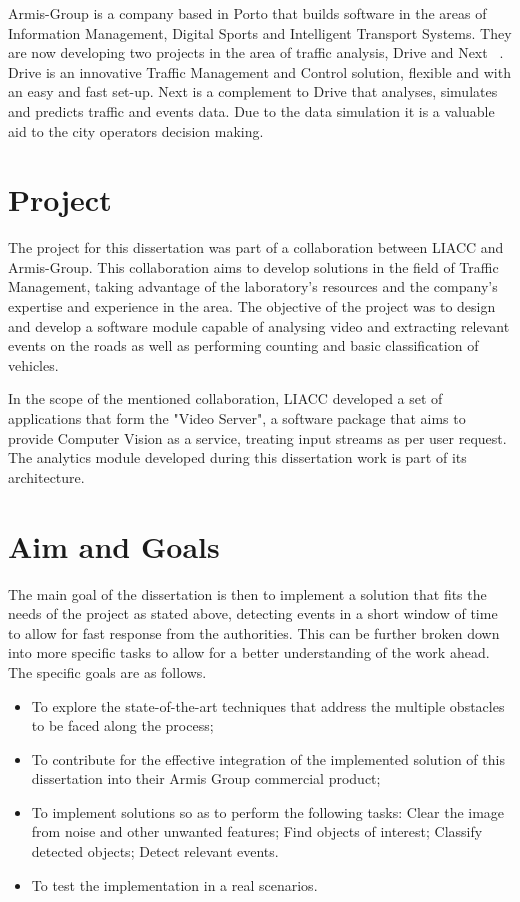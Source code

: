 Armis-Group is a company based in Porto that builds software in the areas of Information Management, Digital Sports and Intelligent Transport Systems. They are now developing two projects in the area of traffic analysis, Drive and Next ~\cite{administrator_intelligent_2017}. Drive is an innovative Traffic Management and Control solution, flexible and with an easy and fast set-up. Next is a complement to Drive that analyses, simulates and predicts traffic and events data. Due to the data simulation it is a valuable aid to the city operators decision making.

\section{Project} \label{sec:proj}

The project for this dissertation was part of a collaboration between LIACC and Armis-Group. This collaboration aims to develop solutions in the field of Traffic Management, taking advantage of the laboratory's resources and the company's expertise and experience in the area. The objective of the project was to design and develop a software module capable of analysing video and extracting relevant events on the roads as well as performing counting and basic classification of vehicles. 

In the scope of the mentioned collaboration, LIACC developed a set of applications that form the "Video Server", a software package that aims to provide Computer Vision as a service, treating input streams as per user request. The analytics module developed during this dissertation work is part of its architecture.

\section{Aim and Goals} \label{sec:goals}

The main goal of the dissertation is then to implement a solution that fits the needs of the project as stated above, detecting events in a short window of time to allow for fast response from the authorities. This can be further broken down into more specific tasks to allow for a better understanding of the work ahead. The specific goals are as follows.

\begin{itemize}
	\item To explore the state-of-the-art techniques that address the multiple obstacles to be faced along the process;
	\item To contribute for the effective integration of the implemented solution of this dissertation into their Armis Group commercial product;
	\item To implement solutions so as to perform the following tasks:
		\subitem Clear the image from noise and other unwanted features;
		\subitem Find objects of interest;
		\subitem Classify detected objects;
		\subitem Detect relevant events.
	\item To test the implementation in a real scenarios.
\end{itemize}


